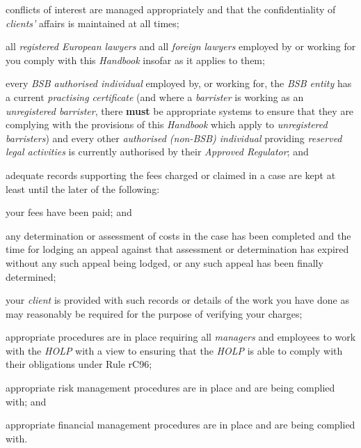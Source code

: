 \begin{numlist}
\item conflicts of interest are managed appropriately and that the
confidentiality of \emph{clients'} affairs is maintained at all times;

\item all \emph{registered European lawyers} and all \emph{foreign lawyers}
employed by or working for you comply with this \emph{Handbook} insofar
as it applies to them;

\item every \emph{BSB authorised individual} employed by, or working for,
the \emph{BSB entity} has a current \emph{practising certificate} (and
where a \emph{barrister} is working as an \emph{unregistered barrister},
there \textcolor{myred}{\textbf{must}} be appropriate systems to ensure that they are complying with
the provisions of this \emph{Handbook} which apply to \emph{unregistered
barristers}) and every other \emph{authorised (non-BSB) individual}
providing \emph{reserved legal activities} is currently authorised by
their \emph{Approved Regulator}; and

\item adequate records supporting the fees charged or claimed in a case are
kept at least until the later of the following:
\begin{alphlist}
\item your fees have been paid; and

\item any determination or assessment of costs in the case has been
completed and the time for lodging an appeal against that assessment or
determination has expired without any such appeal being lodged, or any
such appeal has been finally determined;
\end{alphlist}
\item your \emph{client} is provided with such records or details of the
work you have done as may reasonably be required for the purpose of
verifying your charges;

\item appropriate procedures are in place requiring all \emph{managers}
and employees to work with the \emph{HOLP} with a view to ensuring that
the \emph{HOLP} is able to comply with their obligations under Rule
rC96;

\item appropriate risk management procedures are in place and are being
complied with; and

\item appropriate financial management procedures are in place and are
being complied with.
\end{numlist}


